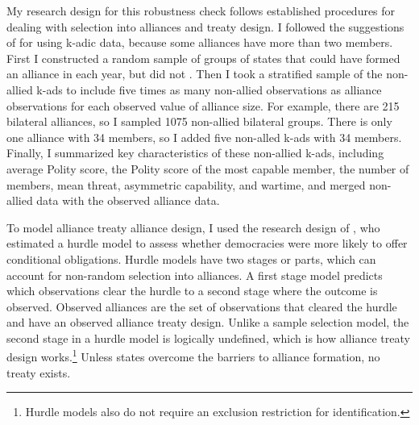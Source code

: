 \documentclass[12pt]{article}
\begin{document}
My research design for this robustness check follows established procedures for dealing with selection into alliances and treaty design. 
I followed the suggestions of \citet{Poast2010} for using k-adic data, because some alliances have more than two members. 
First I constructed a random sample of groups of states that could have formed an alliance in each year, but did not \citep{FordhamPoast2014}.
Then I took a stratified sample of the non-allied k-ads to include five times as many non-allied observations as alliance observations for each observed value of alliance size. 
For example, there are 215 bilateral alliances, so I sampled 1075 non-allied bilateral groups. 
There is only one alliance with 34 members, so I added five non-alled k-ads with 34 members. 
Finally, I summarized key characteristics of these non-allied k-ads, including average Polity score, the Polity score of the most capable member, the number of members, mean threat, asymmetric capability, and wartime, and merged non-allied data with the observed alliance data. 


To model alliance treaty alliance design, I used the research design of \citet{Chibaetal2015}, who estimated a hurdle model to assess whether democracies were more likely to offer conditional obligations.
Hurdle models have two stages or parts, which can account for non-random selection into alliances.
A first stage model predicts which observations clear the hurdle to a second stage where the outcome is observed. 
Observed alliances are the set of observations that cleared the hurdle and have an observed alliance treaty design. 
Unlike a sample selection model, the second stage in a hurdle model is logically undefined, which is how alliance treaty design works.\footnote{Hurdle models also do not require an exclusion restriction for identification.} 
Unless states overcome the barriers to alliance formation, no treaty exists. 
\end{document}
